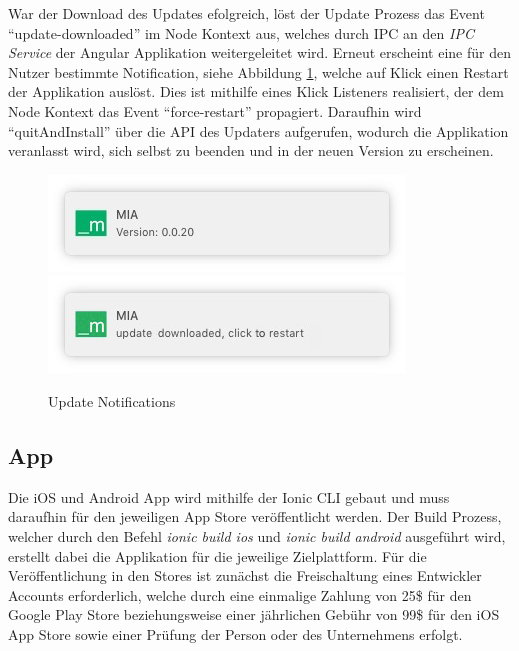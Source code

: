 War der Download des Updates efolgreich, löst der Update Prozess das Event ``update-downloaded'' im Node Kontext aus,
welches durch IPC an den \emph{IPC Service} der Angular Applikation weitergeleitet wird. Erneut erscheint eine für den Nutzer bestimmte Notification, siehe Abbildung \ref{kapitel4/update-push}, welche auf Klick einen Restart der Applikation auslöst.
Dies ist mithilfe eines Klick Listeners realisiert, der dem Node Kontext das Event ``force-restart'' propagiert.
Daraufhin wird ``quitAndInstall'' über die \ac{API} des Updaters aufgerufen, wodurch die Applikation veranlasst wird, sich selbst zu beenden und in der neuen Version zu erscheinen.


\begin{figure}[h]
 \centering
  \includegraphics[width=0.5\linewidth]{kapitel4/version-push.jpg}
 \includegraphics[width=0.5\linewidth]{kapitel4/update-push.jpg}
 \caption{Update Notifications}
 \label{kapitel4/update-push}
\end{figure}
\vspace{0.3cm}


\subsection{App}

Die iOS und Android App wird mithilfe der Ionic \ac{CLI} gebaut und muss daraufhin für den
jeweiligen App Store veröffentlicht werden. Der Build Prozess,
welcher durch den Befehl \emph{ionic build ios} und \emph{ionic build android} ausgeführt wird,
erstellt dabei die Applikation für die jeweilige Zielplattform.
Für die Veröffentlichung in den Stores ist zunächst die Freischaltung eines Entwickler Accounts erforderlich,
welche durch eine einmalige Zahlung von 25\$ für den Google Play Store beziehungsweise einer jährlichen Gebühr von 99\$
für den iOS App Store sowie einer Prüfung der Person oder des Unternehmens erfolgt.
